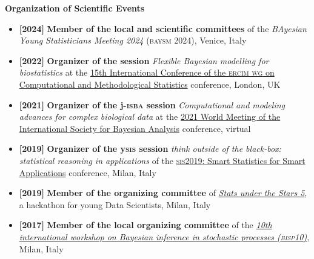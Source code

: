 \documentclass[10pt]{article}
\newenvironment{outerlist}[1][\enskip\tiny\textbullet]%
        {\begin{itemize}[#1]}{\end{itemize}%
         \vspace{-.6\baselineskip}}
\newcommand{\blankline}{\quad\pagebreak[2]}
\begin{document}
\textbf{Organization of Scientific Events}

\begin{outerlist}

\item[\textbf{[2024]}] \textbf{Member of the local and scientific committees} of the \emph{BAyesian Young Statisticians Meeting 2024} (\textsc{baysm 2024}), Venice, Italy

\item[\textbf{[2022]}] \textbf{Organizer of the session} \emph{Flexible Bayesian modelling for biostatistics} at the \href{http://www.cmstatistics.org/CMStatistics2022/}{15th International Conference of the \textsc{ercim wg} on Computational and Methodological Statistics} conference, London, UK

\item[\textbf{[2021]}] \textbf{Organizer of the j-\textsc{isba} session} \emph{Computational and modeling advances for complex biological data} at the \href{https://events.stat.uconn.edu/ISBA2021/}{2021 World Meeting of the International Society for Bayesian Analysis} conference, virtual
\item[\textbf{[2019]}] \textbf{Organizer of the y\textsc{sis} session} \emph{think outside of the black-box: statistical reasoning in applications} of the \href{http://meetings3.sis-statistica.org/index.php/SIS2019/index/schedConfs/current}{\textsc{sis2019}: Smart Statistics for Smart Applications} conference, Milan, Italy
\item[\textbf{[2019]}]  \textbf{Member of the organizing committee} of \href{http://www.sus5.unibocconi.eu}{\emph{Stats under the Stars 5}}, a hackathon for young Data Scientists, Milan, Italy
\item[\textbf{[2017]}]  \textbf{Member of the local organizing committee} of the  \href{https://www.unibocconi.eu/wps/wcm/connect/Site/BISP10/Home/}{\emph{10th international workshop on Bayesian inference in stochastic processes (\textsc{bisp10})}}, Milan, Italy
\end{outerlist}
\blankline
\end{document}
